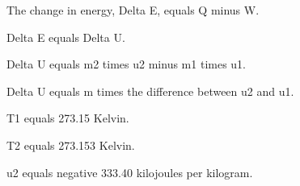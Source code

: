 The change in energy, Delta E, equals Q minus W.

Delta E equals Delta U.

Delta U equals m2 times u2 minus m1 times u1.

Delta U equals m times the difference between u2 and u1.

T1 equals 273.15 Kelvin.

T2 equals 273.153 Kelvin.

u2 equals negative 333.40 kilojoules per kilogram.